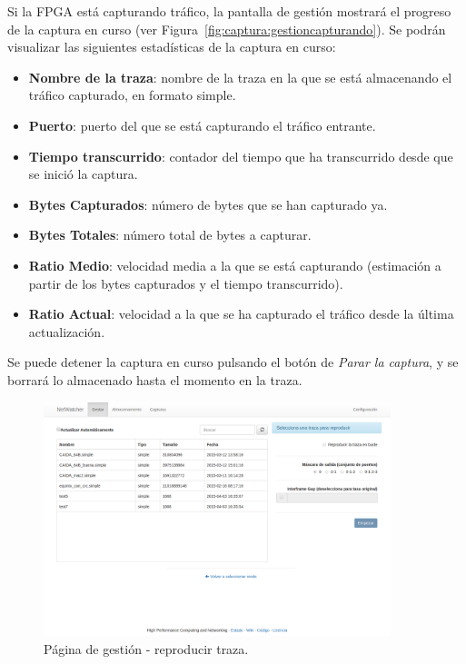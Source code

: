 Si la \gls{FPGA} está capturando tráfico, la pantalla de gestión mostrará el progreso de la captura en curso (ver Figura~\ref{fig:captura:gestioncapturando}).
Se podrán visualizar las siguientes estadísticas de la captura en curso:
\begin{itemize}
  \item \textbf{Nombre de la traza}: nombre de la \gls{traza} en la que se está almacenando el tráfico capturado, en formato \gls{simple}.
  \item \textbf{Puerto}: puerto del que se está capturando el tráfico entrante.
  \item \textbf{Tiempo transcurrido}: contador del tiempo que ha transcurrido desde que se inició la captura.
  \item \textbf{Bytes Capturados}: número de bytes que se han capturado ya.
  \item \textbf{Bytes Totales}: número total de bytes a capturar.
  \item \textbf{Ratio Medio}: velocidad media a la que se está capturando (estimación a partir de los bytes capturados y el tiempo transcurrido).
  \item \textbf{Ratio Actual}: velocidad a la que se ha capturado el tráfico desde la última actualización.
\end{itemize}

Se puede detener la captura en curso pulsando el botón de \textit{Parar la captura}, y se borrará lo almacenado hasta el momento en la \gls{traza}.

\begin{figure}[!htp]
  \centering
  \includegraphics[width=0.9\textwidth,clip=true]{graphics/capturas/gestor_reproducir}
  \caption{Página de gestión - reproducir \gls{traza}.}
  \label{fig:captura:gestionreproducir}
\end{figure}


